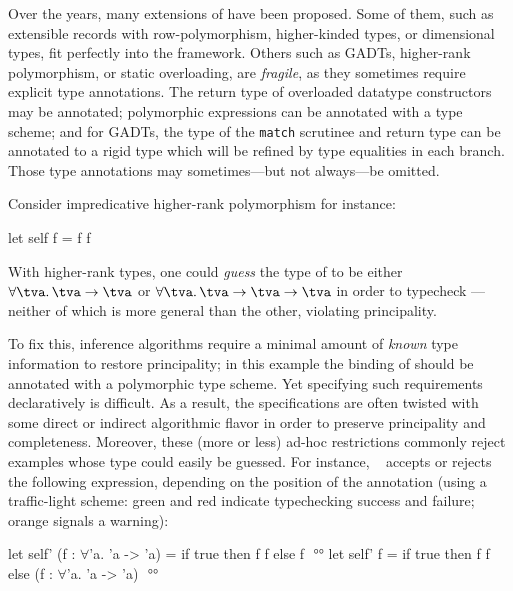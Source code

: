 \documentclass[acmsmall,screen,nonacm,review]{acmart}
\begin{document}

Over the years, many extensions of \ML have been proposed. Some of
them, such as extensible records with row-polymorphism, higher-kinded
types, or dimensional types, fit perfectly into the \ML
framework. Others such as GADTs, higher-rank polymorphism, or static
overloading, are \emph{fragile}, as they sometimes require explicit
type annotations. The return type of overloaded datatype constructors may
be annotated; polymorphic expressions can be annotated with a type
scheme; and for GADTs, the type of the \texttt{match} scrutinee and return
type can be annotated to a rigid type which will be refined by type
equalities in each branch. Those type annotations may sometimes---but
not always---be omitted.

Consider impredicative higher-rank polymorphism for instance:
\begin{program}[input]
let self f = f f
\end{program}
With higher-rank types, one could \emph{guess} the type of  to be
either $\tfor \tv \tv \to \tv$ or $\tfor \tv \tv \to \tv \to \tv$ in order
to typecheck ---neither of which is more general than the other,
violating principality.


To fix this, inference algorithms require a minimal amount of
\emph{known} type information to restore principality; in this example
the binding of  should be annotated with a polymorphic type
scheme. Yet specifying such requirements declaratively is
difficult. As a result, the specifications are often twisted with some
direct or indirect algorithmic flavor in order to preserve
principality and completeness.
%
Moreover, these (more or less) ad-hoc restrictions commonly reject examples
whose type could easily be guessed. For instance, \MLF~\cite{LeBotlan-Remy/recasting-mlf} accepts
or rejects the following expression, depending on the position of the
annotation (using a traffic-light scheme: green and red indicate typechecking success
and failure; orange signals a warning):
\begin{program}[input]
let self' (f : $\forall$'a. 'a -> 'a) = if true then f f else f $
$   °°
let self' f = if true then f f else (f : $\forall$'a. 'a -> 'a) $
$   °°
\end{program}

\end{document}
